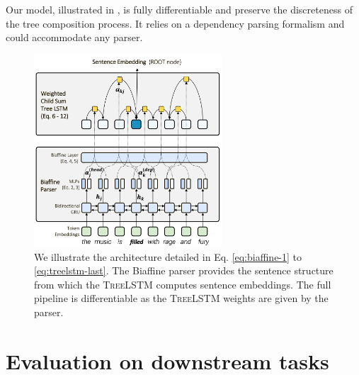 

Our model, illustrated in , is fully differentiable and preserve the discreteness of the tree composition process. It relies on a dependency parsing formalism and could accommodate any  parser.

\begin{figure}[!ht]
	\includegraphics[width=7cm]{images/biaffine-12.png}
	\caption[Biaffine tree lstm]{We illustrate the architecture detailed in Eq. \ref{eq:biaffine-1} to \ref{eq:treelstm-last}. The Biaffine parser provides the sentence structure from which the \textsc{TreeLSTM} computes sentence embeddings. The full pipeline is differentiable as the \textsc{TreeLSTM} weights are given by the parser.}
\end{figure}

\section{Evaluation on downstream tasks}

